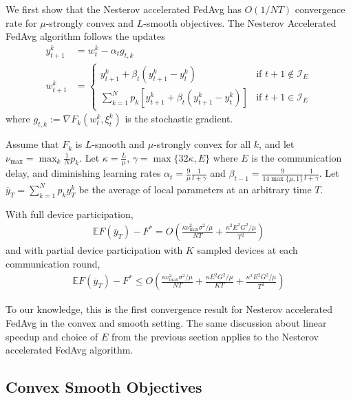 We first show that the Nesterov accelerated FedAvg has $O(1/NT)$
convergence rate for $\mu$-strongly convex and $L$-smooth objectives.
The Nesterov Accelerated FedAvg algorithm follows the updates
\begin{align*}
y_{t+1}^{k} & =w_{t}^{k}-\alpha_{t}g_{t,k}\\
w_{t+1}^{k} & =\begin{cases}
y_{t+1}^{k}+\beta_{t}(y_{t+1}^{k}-y_{t}^{k}) & \text{if }t+1\notin\mathcal{I}_{E}\\
\sum_{k=1}^{N}p_{k}\left[y_{t+1}^{k}+\beta_{t}(y_{t+1}^{k}-y_{t}^{k})\right] & \text{if }t+1\in\mathcal{I}_{E}
\end{cases}
\end{align*}
where $g_{t,k}:=\nabla F_{k}(w_{t}^{k},\xi_{t}^{k})$ is the stochastic
gradient. 
\begin{theorem}
	Assume that $F_{k}$ is $L$-smooth and $\mu$-strongly convex for
	all $k$, and let $\nu_{\max}=\max_{k}\frac{1}{N}p_{k}$. Let $\kappa=\frac{L}{\mu}$,
	$\gamma=\max\{32\kappa,E\}$ where $E$ is the communication delay,
	and diminishing learning rates $\alpha_{t}=\frac{9}{\mu}\frac{1}{t+\gamma}$
	and $\beta_{t-1}=\frac{9}{14\max\{\mu,1\}}\frac{1}{t+\gamma}$. Let
	$\overline{y}_{T}=\sum_{k=1}^{N}p_{k}y_{T}^{k}$ be the average of
	local parameters at an arbitrary time $T$. 
	
	With full device participation, 
	\begin{align*}
	\mathbb{E}F(\overline{y}_{T})-F^{\ast}=O(\frac{\kappa\nu_{\max}^{2}\sigma^{2}/\mu}{NT}+\frac{\kappa^{2}E^{2}G^{2}/\mu}{T^{2}})
	\end{align*}
	and with partial device participation with $K$ sampled devices at
	each communication round, 
	\begin{align*}
	\mathbb{E}F(\overline{y}_{T})-F^{\ast}\leq O(\frac{\kappa\nu_{\max}^{2}\sigma^{2}/\mu}{NT}+\frac{\kappa E^{2}G^{2}/\mu}{KT}+\frac{\kappa^{2}E^{2}G^{2}/\mu}{T^{2}})
	\end{align*}
\end{theorem}
%
\begin{remark}
To our knowledge, this is the first convergence result for Nesterov accelerated FedAvg in the convex and smooth setting. The same discussion about linear speedup and choice of $E$ from the
	previous section applies to the Nesterov accelerated FedAvg algorithm. 
\end{remark}

\subsection{Convex Smooth Objectives}

